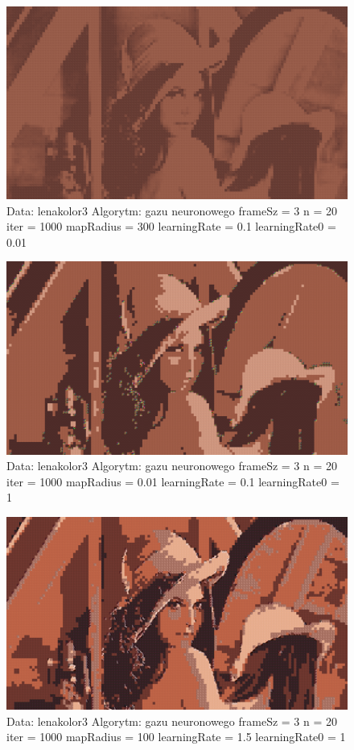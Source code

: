 \documentclass{classrep}
\begin{document}
{{{\newpage

\begin{figure}[h!]
\centering
 \includegraphics[width=12cm]{img/neural_3.png}
 \vspace{-0.0cm}
 \caption{Data: lenakolor3 Algorytm: gazu neuronowego frameSz = 3 n = 20 iter = 1000 mapRadius = 300 learningRate = 0.1 learningRate0  = 0.01
}
\end{figure}

\begin{figure}[h!]
\centering
 \includegraphics[width=12cm]{img/neural_4.png}
 \vspace{-0.0cm}
 \caption{Data: lenakolor3 Algorytm: gazu neuronowego frameSz = 3 n = 20 iter = 1000 mapRadius = 0.01 learningRate = 0.1 learningRate0  = 1
}
\end{figure}

\newpage

\begin{figure}[h!]
\centering
 \includegraphics[width=12cm]{img/neural_5.png}
 \vspace{-0.0cm}
 \caption{Data: lenakolor3 Algorytm: gazu neuronowego frameSz = 3 n = 20 iter = 1000 mapRadius = 100 learningRate = 1.5 learningRate0  = 1
}
\end{figure}
}


}}
\end{document}
